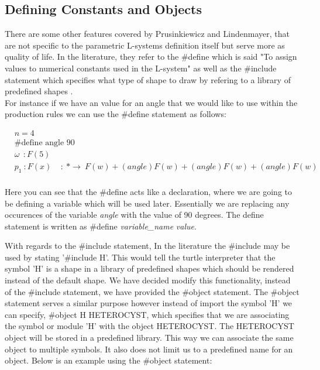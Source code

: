\subsection{Defining Constants and Objects}

\begin{flushleft}

There are some other features covered by Prusinkiewicz and Lindenmayer, that are not specific to the parametric L-systems definition itself but serve more as quality of life. In the literature, they refer to the \#define which is said "To assign values to numerical constants used in the L-system" as well as the \#include statement which specifies what type of shape to draw by refering to a library of predefined shapes \cite{prusinkiewicz2012algorithmic}. \\
For instance if we have an value for an angle that we would like to use within the production rules we can use the \#define statement as follows:

\vspace{5mm}

\begin{equation} \label{define statement example}
\begin{aligned}
	&n=4 \\
	&\textrm{\#define angle 90}\\
	&\omega~~ : F(5)\\
	&p_1~ :  F(x)~~~~~ :~ * \rightarrow~ F(w)+(angle)F(w)+(angle)F(w)+(angle)F(w)\\
\end{aligned}
\end{equation}

\vspace{5mm}

Here you can see that the \#define acts like a declaration, where we are going to be defining a variable which will be used later. Essentially we are replacing any occurences of the variable \textit{angle} with the value of 90 degrees. The define statement is written as  \#define \textit{variable\_name} \textit{value}. \\

\vspace{5mm}

With regards to the \#include statement, In the literature the \#include may be used by stating '\#include H'. This would tell the turtle interpreter that the symbol 'H' is a shape in a library of predefined shapes which should be rendered instead of the default shape. We have decided modify this functionality, instead of the \#include statement, we have provided the \#object statement. The \#object statement serves a similar purpose however instead of import the symbol 'H' we can specify, \#object H HETEROCYST, which specifies that we are associating the symbol or module 'H' with the object HETEROCYST. The HETEROCYST object will be stored in a predefined library. This way we can associate the same object to multiple symbols. It also does not limit us to a predefined name for an object. Below is an example using the \#object statement: \\


\end{flushleft}
